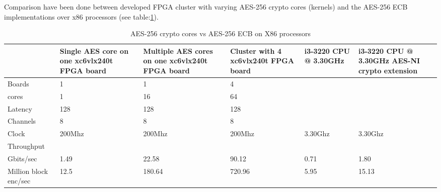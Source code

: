 \documentclass[10pt, conference, compsocconf]{IEEEtran}
\begin{document}
Comparison have been done between developed FPGA cluster with varying AES-256 crypto cores (kernels) and the AES-256 ECB implementations over x86 processors (see table:\ref{tab:AESComp}). 

\begin{table}[!htbp]
  \caption{AES-256 crypto cores vs AES-256 ECB on X86 processors}
  \label{tab:AESComp}
  \scriptsize

  \begin{center}
    \begin{tabular}{|p{1cm}|p{0.9cm}|p{0.9cm}|p{0.9cm}|p{0.8cm}|p{0.8cm}|}
      \hline
       &Single AES core on one xc6vlx240t FPGA board&	Multiple AES cores on one xc6vlx240t FPGA board& Cluster with 4 xc6vlx240t FPGA board& i3-3220 CPU @ 3.30GHz &	i3-3220 CPU @ 3.30GHz AES-NI crypto extension\\
      \hline
      Boards	 &1	  &1	  &4  & & \\
      \hline
      cores	   &1	  &16	  &64	 & & \\	
      \hline
      Latency	 &128&128&128&& \\	
      \hline    
      Channels &8&8&8&& \\	
      \hline
      Clock&200Mhz&200Mhz&200Mhz&3.30Ghz&3.30Ghz\\
      \hline
      Throughput&&&&&\\
      \hline
      Gbits/sec&1.49	&22.58	&90.12	&0.71	&1.80 \\	
      \hline
      Million block enc/sec	&12.5	&180.64	&720.96	&5.95	&15.13 \\	
      \hline      
    \end{tabular}
  \end{center}
\end{table}



\end{document}
